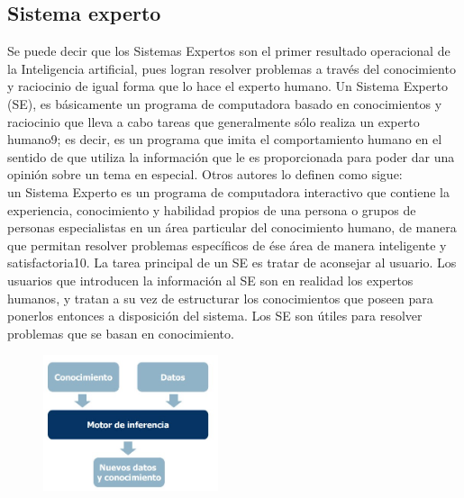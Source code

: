 \documentclass[conference]{IEEEtran}
\begin{document}
\subsection{Sistema experto}
Se puede decir que los Sistemas Expertos son el primer resultado operacional de la Inteligencia
 artificial, pues logran resolver problemas a través del 
 conocimiento y raciocinio de igual forma que lo hace el experto humano. 
 Un Sistema Experto (SE), es básicamente un programa de 
 computadora basado en conocimientos y raciocinio que lleva a cabo tareas que 
 generalmente sólo realiza un experto humano9; es decir, es un programa que 
 imita el comportamiento humano en el sentido de que utiliza la información 
 que le es proporcionada para poder dar una opinión sobre un tema en 
 especial. Otros autores lo definen como sigue:\\ un Sistema Experto es un programa 
 de computadora interactivo que contiene la experiencia, conocimiento y 
 habilidad propios de una persona o grupos de personas especialistas 
 en un área particular del conocimiento humano, de manera que permitan 
 resolver problemas específicos de ése área de manera inteligente y 
 satisfactoria10. La tarea principal de un SE es tratar de aconsejar al usuario. 
 Los usuarios que introducen la información al SE son en realidad los 
 expertos humanos, y tratan a su vez de estructurar los conocimientos 
 que poseen para ponerlos entonces a disposición del sistema. Los SE 
 son útiles para resolver problemas que se basan en conocimiento. 
\begin{figure}[h!]
    \includegraphics[height=4cm]{sistemae.jpg}
\end{figure}
\end{document}
